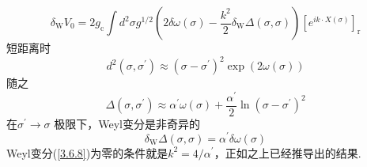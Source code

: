 \begin{equation}\label{3.6.8}
\delta_{\mathrm{W}} V_{0}=2 g_{\mathrm{c}} \int d^{2} \sigma g^{1 / 2}\left(2 \delta \omega(\sigma)-\frac{k^{2}}{2} \delta_{\mathrm{W}} \Delta(\sigma, \sigma)\right)\left[e^{i k \cdot X(\sigma)}\right]_{\mathrm{r}}
\end{equation}
短距离时
\begin{equation}
d^{2}\left(\sigma, \sigma^{\prime}\right) \approx\left(\sigma-\sigma^{\prime}\right)^{2} \exp (2 \omega(\sigma))
\end{equation}
随之
\begin{equation}
\Delta\left(\sigma, \sigma^{\prime}\right) \approx \alpha^{\prime} \omega(\sigma)+\frac{\alpha^{\prime}}{2} \ln \left(\sigma-\sigma^{\prime}\right)^{2}
\end{equation}
在$\sigma^{\prime} \rightarrow \sigma$ 极限下，Weyl变分是非奇异的
\begin{equation}\label{3.6.11}
\delta_{\mathrm{W}} \Delta(\sigma, \sigma)=\alpha^{\prime} \delta \omega(\sigma)
\end{equation}
Weyl变分(\ref{3.6.8})为零的条件就是$k^{2}=4 / \alpha^{\prime}$，正如之上已经推导出的结果.\\

